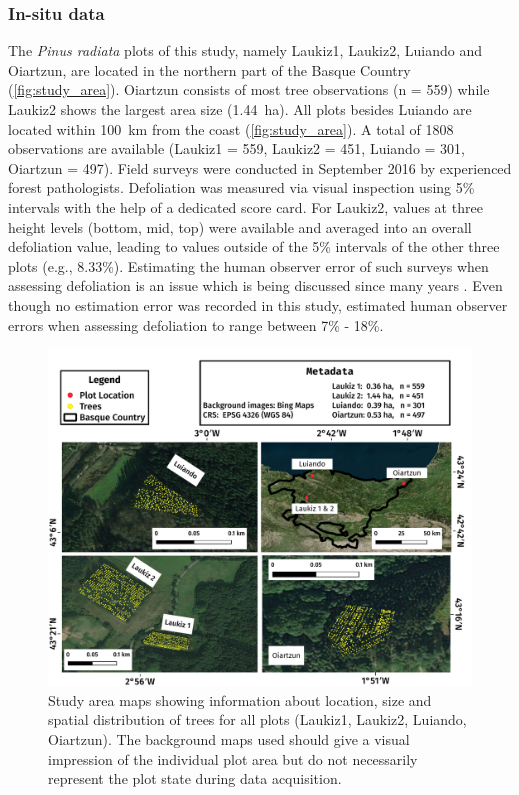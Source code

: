 \documentclass[remotesensing,article,submit,moreauthors,pdftex]{Definitions/mdpi}
\begin{document}
\subsubsection{In-situ data}

The \textit{Pinus radiata} plots of this study, namely Laukiz1, Laukiz2, Luiando and Oiartzun, are located in the northern part of the Basque Country (\autoref{fig:study_area}).
Oiartzun consists of most tree observations (n = 559) while Laukiz2 shows the largest area size (1.44~ha).
All plots besides Luiando are located within 100~km from the coast (\autoref{fig:study_area}).
A total of 1808 observations are available (Laukiz1 = 559, Laukiz2 = 451, Luiando = 301, Oiartzun = 497).
Field surveys were conducted in September 2016 by experienced forest pathologists.
Defoliation was measured via visual inspection using 5\% intervals with the help of a dedicated score card.
For Laukiz2, values at three height levels (bottom, mid, top) were available and averaged into an overall defoliation value, leading to values outside of the 5\% intervals of the other three plots (e.g., 8.33\%).
Estimating the human observer error of such surveys when assessing defoliation is an issue which is being discussed since many years \cite{innes1993}.
Even though no estimation error was recorded in this study, \cite{maclean1982} estimated human observer errors when assessing defoliation to range between 7\% - 18\%.

\begin{figure} [ht!]
	\begin{center}
		\centering
		\includegraphics[width=\textwidth] {study-area-hyperspectral.pdf}
		\caption{Study area maps showing information about location, size and spatial distribution of trees for all plots (Laukiz1, Laukiz2, Luiando, Oiartzun). The background maps used should give a visual impression of the individual plot area but do not necessarily represent the plot state during data acquisition.}\label{fig:study_area}
	\end{center}
\end{figure}
\end{document}
